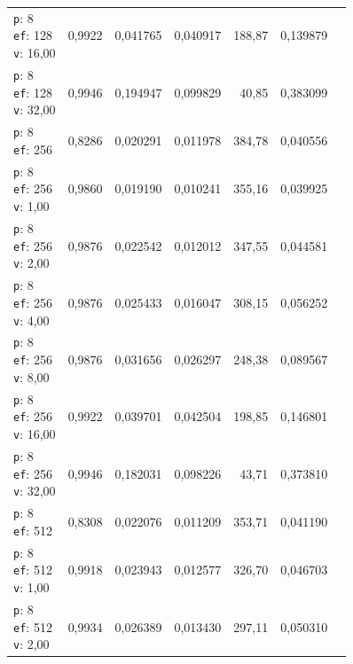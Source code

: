 \begin{table}[htbp]
\begin{tabularx}{\textwidth}{Xrrrrrr}
    \makecell{\texttt{p}: 8\\\texttt{ef}: 128\\\texttt{v}: 16,00} & 0,9922 & 0,041765 & 0,040917 & 188,87 & 0,139879 \\
    \makecell{\texttt{p}: 8\\\texttt{ef}: 128\\\texttt{v}: 32,00} & 0,9946 & 0,194947 & 0,099829 & 40,85 & 0,383099 \\
    \makecell{\texttt{p}: 8\\\texttt{ef}: 256} & 0,8286 & 0,020291 & 0,011978 & 384,78 & 0,040556 \\
    \makecell{\texttt{p}: 8\\\texttt{ef}: 256\\\texttt{v}: 1,00} & 0,9860 & 0,019190 & 0,010241 & 355,16 & 0,039925 \\
    \makecell{\texttt{p}: 8\\\texttt{ef}: 256\\\texttt{v}: 2,00} & 0,9876 & 0,022542 & 0,012012 & 347,55 & 0,044581 \\
    \makecell{\texttt{p}: 8\\\texttt{ef}: 256\\\texttt{v}: 4,00} & 0,9876 & 0,025433 & 0,016047 & 308,15 & 0,056252 \\
    \makecell{\texttt{p}: 8\\\texttt{ef}: 256\\\texttt{v}: 8,00} & 0,9876 & 0,031656 & 0,026297 & 248,38 & 0,089567 \\
    \makecell{\texttt{p}: 8\\\texttt{ef}: 256\\\texttt{v}: 16,00} & 0,9922 & 0,039701 & 0,042504 & 198,85 & 0,146801 \\
    \makecell{\texttt{p}: 8\\\texttt{ef}: 256\\\texttt{v}: 32,00} & 0,9946 & 0,182031 & 0,098226 & 43,71 & 0,373810 \\
    \makecell{\texttt{p}: 8\\\texttt{ef}: 512} & 0,8308 & 0,022076 & 0,011209 & 353,71 & 0,041190 \\
    \makecell{\texttt{p}: 8\\\texttt{ef}: 512\\\texttt{v}: 1,00} & 0,9918 & 0,023943 & 0,012577 & 326,70 & 0,046703 \\
    \makecell{\texttt{p}: 8\\\texttt{ef}: 512\\\texttt{v}: 2,00} & 0,9934 & 0,026389 & 0,013430 & 297,11 & 0,050310 \\

\end{tabularx}
\end{table}
